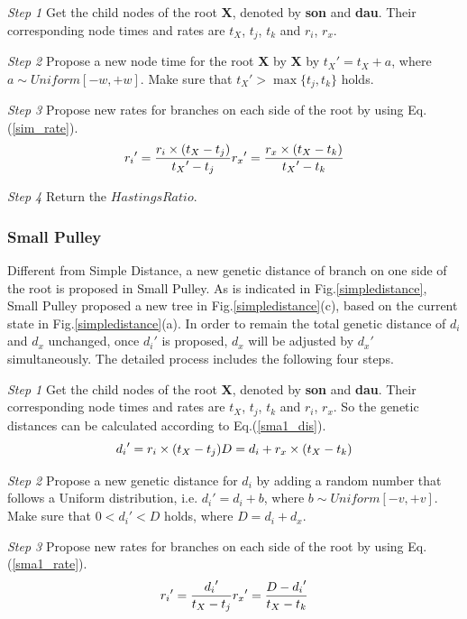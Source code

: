 \documentclass{bmcart}
\begin{document}
\emph{Step 1} Get the child nodes of the root \textbf{X}, denoted by \textbf{son} and \textbf{dau}. Their corresponding node times and rates are $t_X$, $t_j$, $t_k$ and $r_i$, $r_x$.

\emph{Step 2} Propose a new node time for the root \textbf{X} by \textbf{X} by ${t_X}' = {t_X} + a$, where $a \sim Uniform[ - w, + w]$. Make sure that ${t_X}' > \max \{ {t_j},{t_k}\} $ holds.

\emph{Step 3} Propose new rates for branches on each side of the root by using Eq.(\ref{sim_rate}).
\begin{equation}
\label{sim_rate}
{r_i}' = \frac{{{r_i} \times ({{t_X} - {t_j}})}}{{{t_X}' - {t_j}}}\\
{r_x}' = \frac{{{r_x} \times ({{t_X} - {t_k}})}}{{{t_X}' - {t_k}}}
 \end{equation}

\emph{Step 4} Return the $HastingsRatio$.
\subsubsection*{Small Pulley}
Different from Simple Distance, a new genetic distance of branch on one side of the root is proposed in Small Pulley. As is indicated in Fig.\ref{simpledistance}, Small Pulley proposed a new tree in Fig.\ref{simpledistance}(c), based on the current state in Fig.\ref{simpledistance}(a). In order to remain the total genetic distance of $d_i$ and $d_x$ unchanged, once ${d_i}'$ is proposed, $d_x$ will be adjusted by ${d_x}'$ simultaneously. The detailed process includes the following four steps.

\emph{Step 1} Get the child nodes of the root \textbf{X}, denoted by \textbf{son} and \textbf{dau}. Their corresponding node times and rates are $t_X$, $t_j$, $t_k$ and $r_i$, $r_x$. So the genetic distances can be calculated according to Eq.(\ref{sma1_dis}).
\begin{equation}
\label{sma1_dis}
{d_i}' = {r_i} \times ({{t_X} - {t_j}})\\
D = {d_i} + {r_x} \times ({{t_X} - {t_k}})
 \end{equation}

\emph{Step 2} Propose a new genetic distance for $d_i$ by adding a random number that follows a Uniform distribution, i.e.  ${d_i}' = {d_i} + b$, where $b \sim Uniform[ - v, + v]$. Make sure that $0 < {d_i}' < D$ holds, where $D = {d_i} + {d_x}$.

\emph{Step 3} Propose new rates for branches on each side of the root by using Eq.(\ref{sma1_rate}).
\begin{equation}
\label{sma1_rate}
{r_i}' = \frac{{{d_i}'}}{{{t_X} - {t_j}}}\\
{r_x}' = \frac{{D - {d_i}'}}{{{t_X} - {t_k}}}
 \end{equation}
 
\end{document}
